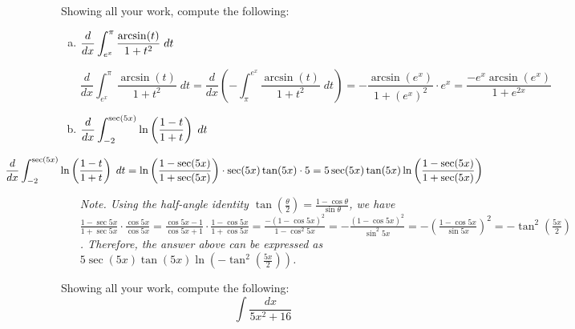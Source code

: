\documentclass[12pt,letterpaper]{exam}
\begin{document}
\begin{questions}
\newpage
\question[10] Showing all your work, compute the following: \par\vspace{0.3cm}
	\begin{enumerate}[(a)]
	\item $\displaystyle \dfrac{d}{dx} \int_{e^x}^\pi \dfrac{\arcsin(t)}{1 + t^2} \;dt$ \par\vspace{1cm} \vfill
	
		\[
		\dfrac{d}{dx} \int_{e^x}^\pi \dfrac{\arcsin(t)}{1 + t^2} \;dt= \dfrac{d}{dx} \left( -\int_\pi^{e^x} \dfrac{\arcsin(t)}{1 + t^2} \;dt \right)= -\dfrac{\arcsin(e^x)}{1 + (e^x)^2} \cdot e^x= \dfrac{-e^x \arcsin(e^x)}{1 + e^{2x}}
		\] \par\vspace{1cm} \vfill
	\item $\displaystyle \dfrac{d}{dx} \int_{-2}^{\sec(5x)} \ln \left( \dfrac{1 - t}{1 + t} \right) \;dt$ \vfill
	
		\[
		\hspace{-2.5cm} \dfrac{d}{dx} \int_{-2}^{\sec(5x)} \ln \left( \dfrac{1 - t}{1 + t} \right) \;dt= \ln \left( \dfrac{1 - \sec(5x)}{1 + \sec(5x)} \right) \cdot \sec(5x) \tan(5x) \cdot 5= 5 \sec(5x) \tan(5x) \ln \left( \dfrac{1 - \sec(5x)}{1 + \sec(5x)} \right)
		\] \vfill
	
	{\itshape\tiny Note. Using the half-angle identity $\tan \left( \frac{\theta}{2} \right)= \frac{1 - \cos \theta}{\sin \theta}$, we have $\frac{1 - \sec 5x}{1 + \sec 5x} \cdot \frac{\cos 5x}{\cos 5x}= \frac{\cos 5x - 1}{\cos 5x + 1} \cdot \frac{1 - \cos 5x}{1 + \cos 5x}= \frac{-(1 - \cos 5x)^2}{1 - \cos^2 5x}= - \frac{(1 - \cos 5x)^2}{\sin^2 5x}= -\left( \frac{1 - \cos 5x}{\sin 5x} \right)^2= -\tan^2 \left( \frac{5x}{2} \right)$. Therefore, the answer above can be expressed as $5 \sec(5x) \tan(5x) \ln \left( -\tan^2 \left(\frac{5x}{2} \right) \right)$.}
	\end{enumerate}



\newpage
\question[10] Showing all your work, compute the following:
	\[
	\int \dfrac{dx}{5x^2 + 16}
	\] \pspace


\end{questions}
\end{document}
